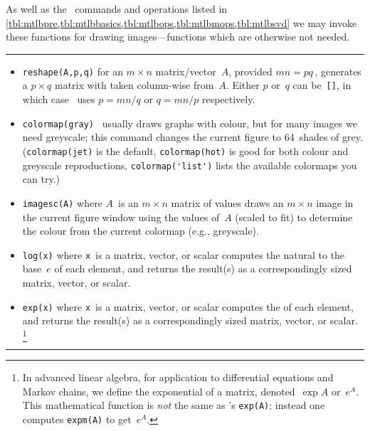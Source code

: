 \begin{table}
\caption{As well as the \script\ commands and operations listed in \cref{tbl:mtlbpre,tbl:mtlbbasics,tbl:mtlbops,tbl:mtlbmops,tbl:mtlbsvd}  we may invoke these functions for drawing images---functions which are otherwise not needed.} \label{tbl:mtlbimag}
\smallskip\hrule\smallskip
\begin{minipage}{\linewidth}
\begin{itemize}

\item {}\verb|reshape(A,p,q)| for an \(m\times n\) matrix\slash vector~\(A\), provided \(mn=pq\)\,, generates a \(p\times q\) matrix with  taken column-wise from~\(A\).  
Either \(p\) or~\(q\) can be~\verb|[]|, in which case \script\ uses \(p=mn/q\) or \(q=mn/p\) respectively.

\item {}\verb|colormap(gray)| \script\ usually draws graphs with colour, but for many images we need greyscale; this command changes the current figure to 64~shades of grey.  
(\verb|colormap(jet)| is the default, \verb|colormap(hot)| is good for both colour and greyscale reproductions, \verb|colormap('list')| lists the available colormaps you can try.)

\item {}\verb|imagesc(A)| where \(A\)~is an \(m\times n\) matrix of values draws an \(m\times n\) image in the current figure window using the values of~\(A\) (scaled to fit) to determine the colour from the current colormap (e.g., greyscale).

\item {}\verb|log(x)| where \verb|x|~is a  matrix, vector, or scalar computes the natural  to the base~\(e\) of each element, and returns the result(s) as a correspondingly sized matrix, vector, or scalar.

\item {}\verb|exp(x)| where \verb|x|~is a  matrix, vector, or scalar computes the  of each element, and returns the result(s) as a correspondingly sized matrix, vector, or scalar.%
\footnote{In advanced linear algebra, for application to differential equations and Markov chains, we define the exponential of a matrix, denoted~\(\exp A\) or~\(e^A\).  
This mathematical function is \emph{not} the same as \script's \texttt{exp(A)}; instead one computes \texttt{expm(A)} to get~\(e^A\).}

\end{itemize}
\end{minipage}
\smallskip\hrule
\end{table}









